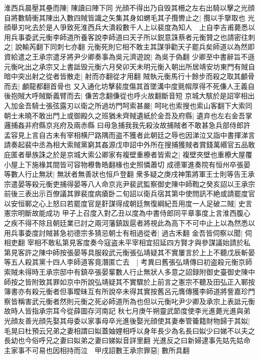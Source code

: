 淮西兵晨壓其壘而陳|{
	陳讀曰陣下同}
光顔不得出乃自毁其柵之左右出騎以擊之光顔自將數騎衝其陳出入數四賊皆識之矢集其身如蝟毛其子攬轡止之|{
	攬以手擥取也}
光顔舉刃叱去於是人爭致死淮西兵大潰殺數千人上以裴度為知人　上自李吉甫薨悉以用兵事委武元衡李師道所養客說李師道曰天子所以鋭意誅蔡者元衡贊之也請密往刺之|{
	說輸芮翻下同刺七亦翻}
元衡死則它相不敢主其謀爭勸天子罷兵矣師道以為然即資給遣之王承宗遣牙將尹少卿奏事為吳元濟遊說|{
	為吳于偽翻}
少卿至中書辭旨不遜元衡叱出之承宗又上書詆毁元衡六月癸卯天未明元衡入朝出所居靖安坊東門有賊自暗中突出射之從者皆散走|{
	射而亦翻從才用翻}
賊執元衡馬行十餘步而殺之取其顱骨而去|{
	顱龍都翻首骨也}
又入通化坊擊裴度傷其首墜溝中度氈㡌厚得不死傔人王義自後抱賊大呼賊斷義臂而去|{
	傔苦念翻傔從也呼火故翻斷音短}
京城大駭於是詔宰相出入加金吾騎士張弦露刃以衛之所過坊門呵索甚嚴|{
	呵叱也索搜也索山客翻下大索同}
朝士未曉不敢出門上或御殿久之班猶未齊賊遺紙於金吾及府縣|{
	遺弃也左右金吾掌邏捕姦非府縣京兆府及兩赤縣}
曰毋急捕我我先殺汝故捕賊者不敢甚急兵部侍郎許孟容見上言自古未有宰相横尸路隅而盗不獲者此朝廷之辱也因涕泣又詣中書揮涕言請奏起裴中丞為相大索賊黨窮其姦源戊申詔中外所在搜捕獲賊者賞錢萬緡官五品敢庇匿者舉族誅之於是京城大索公卿家有複壁重橑者皆索之|{
	複壁夾壁也重橑大屋覆小屋上下施椽其間皆可容物橑魯皓翻椽也史照憐蕭切}
成德軍進奏院有恒州卒張晏等數人行止無狀|{
	無狀者無善狀也恒戶登翻}
衆多疑之庚戌神策將軍王士則等告王承宗遣晏等殺元衡吏捕得晏等八人命京兆尹裴武監察御史陳中師鞫之癸亥詔以王承宗前後三表出示百僚議其罪裴度病瘡卧二旬詔以衛兵宿其第中使問訊不絶或請罷度官以安恒鄆之心上怒曰若罷度官是姧謀得成朝廷無復綱紀吾用度一人足破二賊|{
	史言憲宗明斷故能成功}
甲子上召度入對乙丑以度為中書侍郎同平章事度上言淮西腹心之疾不得不除且朝廷業已討之兩河藩鎮跋扈者將視此為高下不可中止上以為然悉以用兵事委度討賊甚急初德宗多猜忌朝士有相過從者|{
	過古禾翻}
金吾皆伺察以聞|{
	伺相吏翻}
宰相不敢私第見客度奏今寇盗未平宰相宜招延四方賢才與參謀議始請於私第見客許之陳中師按張晏等具服殺武元衡張弘靖疑其不實屢言於上上不聽戊辰斬晏等五人殺其黨十四人李師道客竟潛匿亡去　|{
	考異曰舊張弘靖傳曰初盗殺元衡京師索賊未得時王承宗邸中有鎮卒張晏輩數人行止無狀人多意之詔録附御史臺御史陳中師按之皆附致其罪如京中所說弘靖疑其不實驟於上前言之憲宗不聽及田弘正入鄆按簿書亦有殺元衡者但事曖昧互有所說卒未得其實按舊呂元膺傳獲李師道將訾嘉珍門察皆稱害武元衡者然則元衡之死必師道所為也但以元衡叱尹少卿及承宗上表詆元衡故時人皆指承宗耳今從薛圖存河南記}
秋七月庚午朔靈武節度使李光進薨光進與弟光顔友善光顔先娶其母委以家事母卒光進後娶光顔使其妻奉管籥籍財物歸于其姒|{
	毛晃曰杜預云兄弟之妻相謂曰姒蓋妯娌相呼以身年長少為名長曰姒少曰娣不以夫之長幼也今俗呼兄之妻曰姒弟之妻曰娣姒音詳里翻}
光進反之曰新婦逮事先姑先姑命主家事不可易也因相持而泣　甲戌詔數王承宗罪惡|{
	數所具翻}
